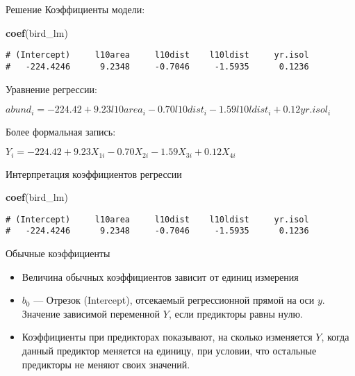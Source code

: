\documentclass[
  ignorenonframetext,
  t,xcolor=table]{beamer}
\newenvironment{Shaded}{\begin{snugshade}}{\end{snugshade}}
\newcommand{\FunctionTok}[1]{\textcolor[rgb]{0.13,0.29,0.53}{\textbf{#1}}}
\newcommand{\NormalTok}[1]{#1}
\providecommand{\tightlist}{%
  \setlength{\itemsep}{0pt}\setlength{\parskip}{0pt}}
\begin{document}
\begin{frame}[fragile]{Решение}
\protect\hypertarget{ux440ux435ux448ux435ux43dux438ux435-1}{}
Коэффициенты модели:

\begin{Shaded}
\begin{Highlighting}[]
\FunctionTok{coef}\NormalTok{(bird\_lm)}
\end{Highlighting}
\end{Shaded}

\begin{verbatim}
# (Intercept)     l10area     l10dist    l10ldist     yr.isol 
#   -224.4246      9.2348     -0.7046     -1.5935      0.1236
\end{verbatim}

Уравнение регрессии:

\(abund _i = - 224.42 + 9.23 l10area _i - 0.70 l10dist _i - 1.59 l10ldist _i + 0.12 yr.isol_i\)

Более формальная запись:

\(Y_i = - 224.42 + 9.23 X_{1i} - 0.70 X_{2i} - 1.59 X_{3i} + 0.12 X_{4i}\)
\end{frame}

\begin{frame}[fragile]{Интерпретация коэффициентов регрессии}
\protect\hypertarget{ux438ux43dux442ux435ux440ux43fux440ux435ux442ux430ux446ux438ux44f-ux43aux43eux44dux444ux444ux438ux446ux438ux435ux43dux442ux43eux432-ux440ux435ux433ux440ux435ux441ux441ux438ux438}{}
\begin{Shaded}
\begin{Highlighting}[]
\FunctionTok{coef}\NormalTok{(bird\_lm)}
\end{Highlighting}
\end{Shaded}

\begin{verbatim}
# (Intercept)     l10area     l10dist    l10ldist     yr.isol 
#   -224.4246      9.2348     -0.7046     -1.5935      0.1236
\end{verbatim}

\pause

\begin{block}{Обычные коэффициенты}
\protect\hypertarget{ux43eux431ux44bux447ux43dux44bux435-ux43aux43eux44dux444ux444ux438ux446ux438ux435ux43dux442ux44b}{}
\begin{itemize}
\tightlist
\item
  Величина обычных коэффициентов зависит от единиц измерения
\item
  \(b_0\) --- Отрезок (Intercept), отсекаемый регрессионной прямой на
  оси \(y\). Значение зависимой переменной \(Y\), если предикторы равны
  нулю.
\item
  Коэффициенты при предикторах показывают, на сколько изменяется \(Y\),
  когда данный предиктор меняется на единицу, при условии, что остальные
  предикторы не меняют своих значений.
\end{itemize}
\end{block}
\end{frame}
\end{document}
